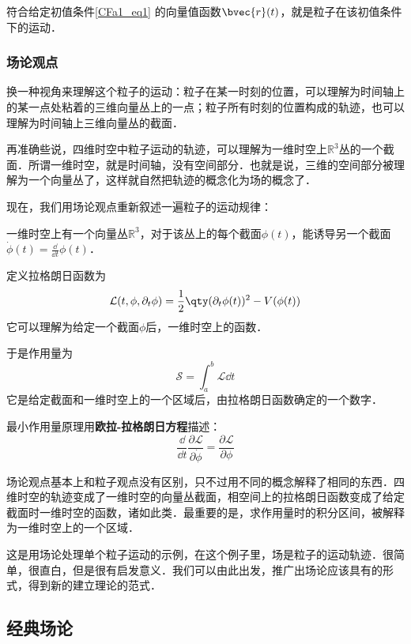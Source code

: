 符合给定初值条件\autoref{CFa1_eq1} 的向量值函数$\bvec{r}(t)$，就是粒子在该初值条件下的运动．


\subsubsection{场论观点}

换一种视角来理解这个粒子的运动：粒子在某一时刻的位置，可以理解为时间轴上的某一点处粘着的三维向量丛上的一点；粒子所有时刻的位置构成的轨迹，也可以理解为时间轴上三维向量丛的截面．

再准确些说，四维时空中粒子运动的轨迹，可以理解为一维时空上$\mathbb{R}^3$丛的一个截面．所谓一维时空，就是时间轴，没有空间部分．也就是说，三维的空间部分被理解为一个向量丛了，这样就自然把轨迹的概念化为场的概念了．

现在，我们用场论观点重新叙述一遍粒子的运动规律：

一维时空上有一个向量丛$\mathbb{R}^3$，对于该丛上的每个截面$\phi(t)$，能诱导另一个截面$\dot{\phi}(t)=\frac{\dd}{\dd t}\phi(t)$．

定义拉格朗日函数为
\begin{equation}\label{CFa1_eq2}
\mathcal{L}(t, \phi, \partial_t\phi) = \frac{1}{2}\qty(\partial_t \phi(t))^2 - V(\phi(t))
\end{equation}
它可以理解为给定一个截面$\phi$后，一维时空上的函数．

于是作用量为
\begin{equation}\label{CFa1_eq4}
\mathcal{S}=\int_a^b \mathcal{L}\dd t
\end{equation}
它是给定截面和一维时空上的一个区域后，由拉格朗日函数确定的一个数字．

最小作用量原理用\textbf{欧拉-拉格朗日方程}描述：
\begin{equation}
\frac{\dd}{\dd t}\frac{\partial\mathcal{L}}{\partial\dot{\phi}} = \frac{\partial \mathcal{L}}{\partial\phi}
\end{equation}

场论观点基本上和粒子观点没有区别，只不过用不同的概念解释了相同的东西．四维时空的轨迹变成了一维时空的向量丛截面，相空间上的拉格朗日函数变成了给定截面时一维时空的函数，诸如此类．最重要的是，求作用量时的积分区间，被解释为一维时空上的一个区域．

这是用场论处理单个粒子运动的示例，在这个例子里，场是粒子的运动轨迹．很简单，很直白，但是很有启发意义．我们可以由此出发，推广出场论应该具有的形式，得到新的建立理论的范式．


\subsection{经典场论}

